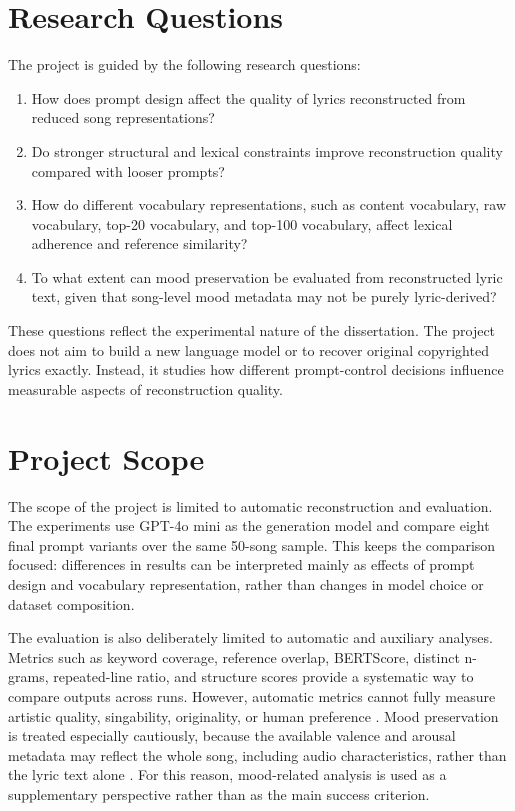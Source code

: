 \section{Research Questions}

The project is guided by the following research questions:

\begin{enumerate}
    \item How does prompt design affect the quality of lyrics reconstructed from reduced song representations?
    \item Do stronger structural and lexical constraints improve reconstruction quality compared with looser prompts?
    \item How do different vocabulary representations, such as content vocabulary, raw vocabulary, top-20 vocabulary, and top-100 vocabulary, affect lexical adherence and reference similarity?
    \item To what extent can mood preservation be evaluated from reconstructed lyric text, given that song-level mood metadata may not be purely lyric-derived?
\end{enumerate}

These questions reflect the experimental nature of the dissertation. The project does not aim to build a new language model or to recover original copyrighted lyrics exactly. Instead, it studies how different prompt-control decisions influence measurable aspects of reconstruction quality.

\section{Project Scope}

The scope of the project is limited to automatic reconstruction and evaluation. The experiments use GPT-4o mini as the generation model and compare eight final prompt variants over the same 50-song sample. This keeps the comparison focused: differences in results can be interpreted mainly as effects of prompt design and vocabulary representation, rather than changes in model choice or dataset composition.

The evaluation is also deliberately limited to automatic and auxiliary analyses. Metrics such as keyword coverage, reference overlap, BERTScore, distinct n-grams, repeated-line ratio, and structure scores provide a systematic way to compare outputs across runs. However, automatic metrics cannot fully measure artistic quality, singability, originality, or human preference \cite{reiter2018bleu,vanDerLee2019human}. Mood preservation is treated especially cautiously, because the available valence and arousal metadata may reflect the whole song, including audio characteristics, rather than the lyric text alone \cite{laurier2008multimodal,delbouys2018musicmood}. For this reason, mood-related analysis is used as a supplementary perspective rather than as the main success criterion.

